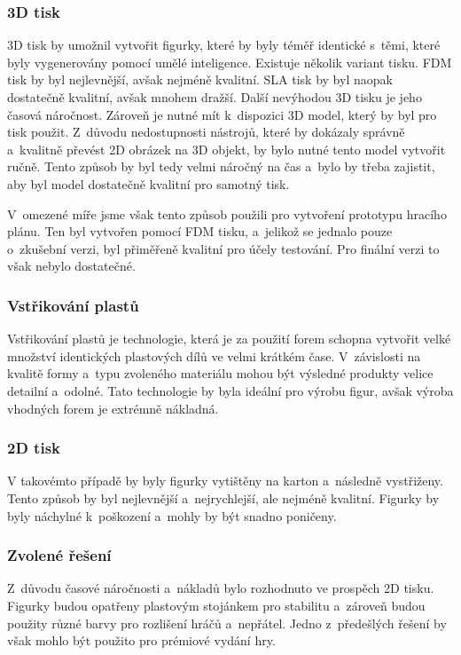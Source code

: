 \subsubsection*{3D tisk}
3D tisk by umožnil vytvořit figurky, které by byly téměř identické s~těmi, které byly vygenerovány pomocí umělé inteligence. Existuje několik variant tisku. FDM tisk by byl nejlevnější, avšak nejméně kvalitní. SLA tisk by byl naopak dostatečně kvalitní, avšak mnohem dražší. Další nevýhodou 3D tisku je jeho časová náročnost. Zároveň je nutné mít k~dispozici 3D model, který by byl pro tisk použit. Z~důvodu nedostupnosti nástrojů, které by dokázaly správně a~kvalitně převést 2D obrázek na 3D objekt, by bylo nutné tento model vytvořit ručně. Tento způsob by byl tedy velmi náročný na čas a~bylo by třeba zajistit, aby byl model dostatečně kvalitní pro samotný tisk.

V~omezené míře jsme však tento způsob použili pro vytvoření prototypu hracího plánu. Ten byl vytvořen pomocí FDM tisku, a~jelikož se jednalo pouze o~zkušební verzi, byl přiměřeně kvalitní pro účely testování. Pro finální verzi to však nebylo dostatečné.

\subsubsection*{Vstřikování plastů}
Vstřikování plastů je technologie, která je za použití forem schopna vytvořit velké množství identických plastových dílů ve velmi krátkém čase. V~závislosti na kvalitě formy a~typu zvoleného materiálu mohou být výsledné produkty velice detailní a~odolné. Tato technologie by byla ideální pro výrobu figur, avšak výroba vhodných forem je extrémně nákladná.

\subsubsection*{2D tisk}
V takovémto případě by byly figurky vytištěny na karton a~následně vystřiženy. Tento způsob by byl nejlevnější a~nejrychlejší, ale nejméně kvalitní. Figurky by byly náchylné k~poškození a~mohly by být snadno poničeny.

\subsubsection*{Zvolené řešení}
Z~důvodu časové náročnosti a~nákladů bylo rozhodnuto ve prospěch 2D tisku. Figurky budou opatřeny plastovým stojánkem pro stabilitu a~zároveň budou použity různé barvy pro rozlišení hráčů a~nepřátel. Jedno z~předešlých řešení by však mohlo být použito pro prémiové vydání hry.

